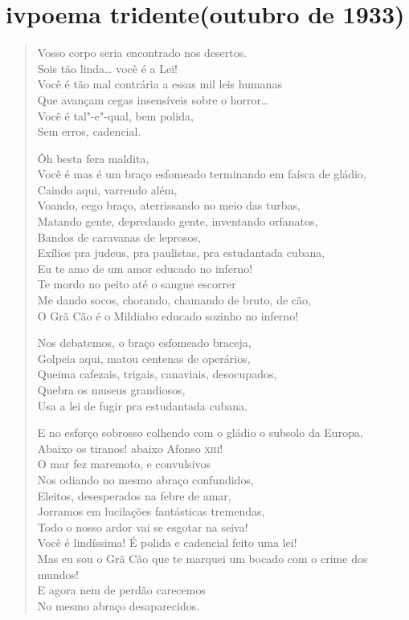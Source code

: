 {\section*{iv\break poema tridente\break (outubro de 1933)}

\begin{verse}
Vosso corpo seria encontrado nos desertos.\\
Sois tão linda\ldots{} você é a Lei!\\
Você é tão mal contrária a essas mil leis humanas\\
Que avançam cegas insensíveis sobre o horror\ldots{}\\
Você é tal"-e"-qual, bem polida,\\
Sem erros, cadencial.

Ôh besta fera maldita,\\
Você é mas é um braço esfomeado terminando em faísca de gládio,\\
Caindo aqui, varrendo além,\\
Voando, cego braço, aterrissando no meio das turbas,\\
Matando gente, depredando gente, inventando orfanatos,\\
Bandos de caravanas de leprosos,\\
Exílios pra judeus, pra paulistas, pra estudantada cubana,\\
Eu te amo de um amor educado no inferno!\\
Te mordo no peito até o sangue escorrer\\
Me dando socos, chorando, chamando de bruto, de cão,\\
O Grã Cão é o Mildiabo educado sozinho no inferno!

Nos debatemos, o braço esfomeado braceja,\\
Golpeia aqui, matou centenas de operários,\\
Queima cafezais, trigais, canaviais, desocupados,\\
Quebra os museus grandiosos,\\
Usa a lei de fugir pra estudantada cubana.

E no esforço sobrosso colhendo com o gládio o subsolo da Europa,\\
Abaixo os tiranos! abaixo Afonso \textsc{xiii}!\\
O mar fez maremoto, e convulsivos\\
Nos odiando no mesmo abraço confundidos,\\
Eleitos, desesperados na febre de amar,\\
Jorramos em lucilações fantásticas tremendas,\\
Todo o nosso ardor vai se esgotar na seiva!\\
Você é lindíssima! É polida e cadencial feito uma lei!\\
Mas eu sou o Grã Cão que te marquei um bocado com o crime dos mundos!\\
E agora nem de perdão carecemos\\
No mesmo abraço desaparecidos.
\end{verse}

}
